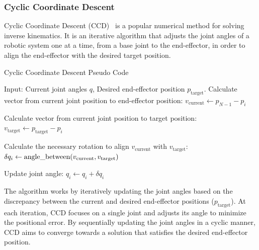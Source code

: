 \subsubsection{Cyclic Coordinate Descent}

Cyclic Coordinate Descent (CCD)~\cite{NumericalMethods} is a popular numerical method for solving inverse kinematics. It is an iterative algorithm that adjusts the joint angles of a robotic system one at a time, from a base joint to the end-effector, in order to align the end-effector with the desired target position.

\begin{algorithm}
    \caption{Cyclic Coordinate Descent Pseudo Code}\label{alg:CCD}
    \begin{algorithmic}
        \State{} Input: Current joint angles $q$, Desired end-effector position $p_\text{target}$.
                \State{} Calculate vector from current joint position to end-effector position:
                \State{} $v_\text{current} \leftarrow p_{N-1} - p_i$

                \State{} Calculate vector from current joint position to target position:
                \State{} $v_\text{target} \leftarrow p_\text{target} - p_i$

                \State{} Calculate the necessary rotation to align $v_\text{current}$ with $v_\text{target}$:
                \State{} $\delta q_i \leftarrow \text{angle\textunderscore between}(v_\text{current}, v_\text{target})$

                \State{} Update joint angle:
                \State{} $q_i \leftarrow q_i + \delta q_i$
            \EndFor{}
        \EndWhile{}
\end{algorithmic}
\end{algorithm}

The algorithm works by iteratively updating the joint angles based on the discrepancy between the current and desired end-effector positions ($p_\text{target}$). At each iteration, CCD focuses on a single joint and adjusts its angle to minimize the positional error. By sequentially updating the joint angles in a cyclic manner, CCD aims to converge towards a solution that satisfies the desired end-effector position.

